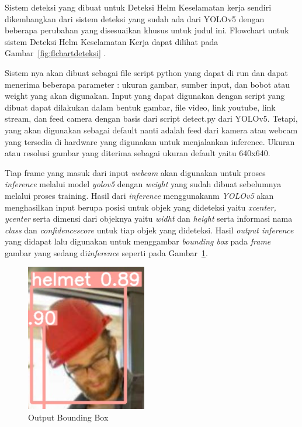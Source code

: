 Sistem deteksi yang dibuat untuk Deteksi Helm Keselamatan kerja sendiri dikembangkan dari sistem deteksi yang sudah ada dari YOLOv5 dengan beberapa perubahan yang disesuaikan khusus untuk judul ini. Flowchart untuk sistem Deteksi Helm Keselamatan Kerja dapat dilihat pada Gambar~\ref{fig:flchartdeteksi} .


Sistem nya akan dibuat sebagai file script python yang dapat di run dan dapat menerima beberapa parameter : ukuran gambar, sumber input, dan bobot atau weight yang akan digunakan. 
Input yang dapat digunakan dengan script yang dibuat dapat dilakukan dalam bentuk gambar, file video, link youtube, link stream, dan feed camera dengan basis dari script detect.py dari YOLOv5. Tetapi, yang akan digunakan sebagai default nanti adalah feed dari kamera atau webcam yang tersedia di hardware yang digunakan untuk menjalankan inference. Ukuran atau resolusi gambar yang diterima sebagai ukuran default yaitu 640x640. 


Tiap frame yang masuk dari input \emph{webcam} akan digunakan untuk proses \emph{inference} melalui model \emph{yolov5} dengan \emph{weight} yang sudah dibuat sebelumnya melalui proses training. Hasil dari \emph{inference} menggunakanm \emph{YOLOv5} akan menghasilkan input berupa posisi untuk objek yang dideteksi yaitu \emph{xcenter, ycenter} serta dimensi dari objeknya yaitu \emph{widht} dan \emph{height} serta informasi nama \emph{class} dan \emph{confidence\textunderscore score} untuk tiap objek yang dideteksi. Hasil \emph{output inference} yang didapat lalu digunakan untuk menggambar \emph{bounding box} pada \emph{frame} gambar yang sedang di\emph{inference} seperti pada Gambar~\ref{fig:outputboundingbox}.

\begin{figure}[ht]
  \centering
  \includegraphics[scale=1]{gambar/bounding_box.png}
  \caption{Output Bounding Box}
  \label{fig:outputboundingbox}
\end{figure}

